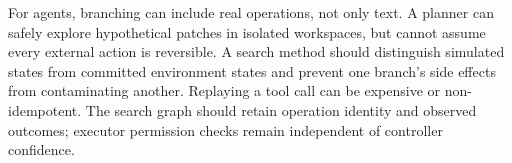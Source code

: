 For agents, branching can include real operations, not only text. A planner can safely explore hypothetical patches in isolated workspaces, but cannot assume every external action is reversible. A search method should distinguish simulated states from committed environment states and prevent one branch's side effects from contaminating another. Replaying a tool call can be expensive or non-idempotent. The search graph should retain operation identity and observed outcomes; executor permission checks remain independent of controller confidence.

